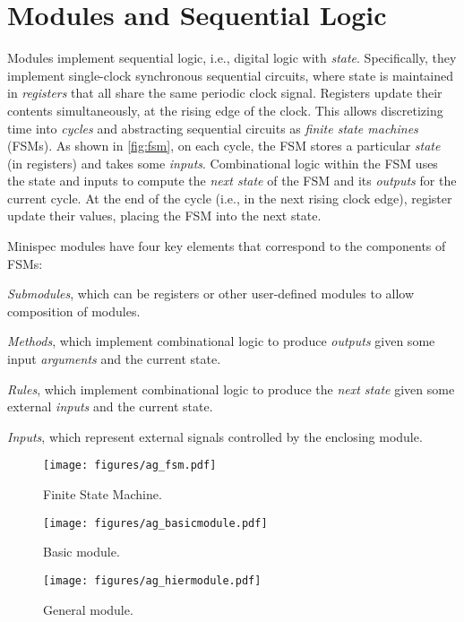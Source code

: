 \section{Modules and Sequential Logic}
\label{sec:modules}

Modules implement sequential logic, i.e., digital logic with \emph{state}.
Specifically, they implement single-clock synchronous sequential circuits,
where state is maintained in \emph{registers} that all share the same periodic clock signal.
Registers update their contents simultaneously, at the rising edge of the clock.
This allows discretizing time into \emph{cycles} and abstracting sequential circuits
as \emph{finite state machines} (FSMs).
As shown in \autoref{fig:fsm}, on each cycle, the FSM stores a particular \emph{state} (in registers)
and takes some \emph{inputs}.
Combinational logic within the FSM uses the state and inputs to compute the
\emph{next state} of the FSM and its \emph{outputs} for the current cycle.
At the end of the cycle (i.e., in the next rising clock edge),
register update their values, placing the FSM into the next state.

Minispec modules have four key elements that correspond to the components of FSMs:
\begin{compactenum}
\item \emph{Submodules}, which can be registers or other user-defined modules to allow composition of modules.
\item \emph{Methods}, which implement combinational logic to produce \emph{outputs} given some input \emph{arguments} and the current state.
\item \emph{Rules}, which implement combinational logic to produce the \emph{next state} given some external \emph{inputs} and the current state.
\item \emph{Inputs}, which represent external signals controlled by the enclosing module.
\end{compactenum}

\begin{figure}[h]
\centering
\begin{minipage}[b]{0.32\columnwidth}
\centering
\texttt{[image: figures/ag\_fsm.pdf]}
\caption{Finite State Machine.}
\label{fig:fsm}
\end{minipage}
\hfill
\begin{minipage}[b]{0.32\columnwidth}
\centering
\texttt{[image: figures/ag\_basicmodule.pdf]}
\caption{Basic module.}
\label{fig:basicmodule}
\end{minipage}
\hfill
\begin{minipage}[b]{0.32\columnwidth}
\centering
\texttt{[image: figures/ag\_hiermodule.pdf]}
\caption{General module.}
\label{fig:hiermodule}
\end{minipage}
\end{figure}


